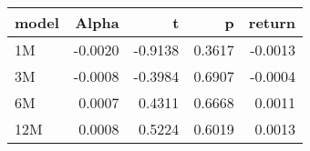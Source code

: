 \begin{table}[ht]
\centering
\begin{tabular}{lrrrr}
  \hline
model & Alpha & t & p & return \\ 
  \hline
1M & -0.0020 & -0.9138 & 0.3617 & -0.0013 \\ 
  3M & -0.0008 & -0.3984 & 0.6907 & -0.0004 \\ 
  6M & 0.0007 & 0.4311 & 0.6668 & 0.0011 \\ 
  12M & 0.0008 & 0.5224 & 0.6019 & 0.0013 \\ 
   \hline
\end{tabular}
\end{table}

